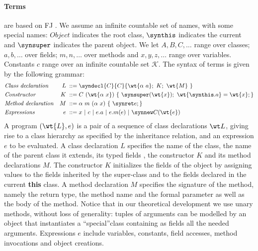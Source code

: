 \paragraph{Terms}
are based on FJ \cite{featherweight}.
We assume an infinite countable set of names, with some special names: $\mathit{Object}$ indicates the root class, $\synthis$  indicates the current and $\synsuper$ indicates the parent object.
We let  $A, B, C, \ldots$ range over classes; $a, b, \ldots$ over fields; $m, n, \ldots$ over methods and $x, y, z, \ldots$ range over variables.
Constants $c$ range over an infinite countable set $\mathcal{K}$.
The syntax of terms is given by the following grammar:
\begin{align*}
& \mbox{\textit{Class declaration}} & L \; ::= \; & \syndecl{C}{C}{\wt{\alpha \ a};\ K; \ \wt{M}\ }\\
& \mbox{\textit{Constructor}} & K \;::=\; & C\ (\wt{\alpha\ x})\ \{\ \synsuper(\wt{x});\ \wt{\synthis.a}=\wt{x}; \}\\
& \mbox{\textit{Method declaration}} & M \; ::= \; & \alpha \ m\ (\alpha \ x)\ \{\ \synret e; \} \\
& \mbox{\textit{Expressions}} & e \; ::=\; & x\ |\  c\ |\ e.a\ |\ e.m(e) \ | \ \synnew C(\wt{e})
\end{align*}
A {program} $(\wt{L}, e)$ is a pair of a sequence of class declarations $\wt L$, giving rise to a class hierarchy as specified by the inheritance relation, and an expression $e$ to be evaluated. 
%
A class declaration $L$ specifies the name of the class, the name of the parent class it extends, its typed fields , the constructor $K$ and its method declarations $M$.
The constructor $K$ initializes the fields of the object by assigning values to the fields inherited by the super-class and to the fields declared in the current \textbf{this} class.
%
A method declaration $M$ specifies the signature of the method, namely the return type, the method name and the formal parameter as well as the body of the method.
Notice that in our theoretical development we use unary methods, without loss of generality: tuples of arguments can be modelled by an object that instantiates a ``special''class containing as fields all the needed arguments.
Expressions $e$ include variables, constants, field accesses, method invocations and object creations. 

